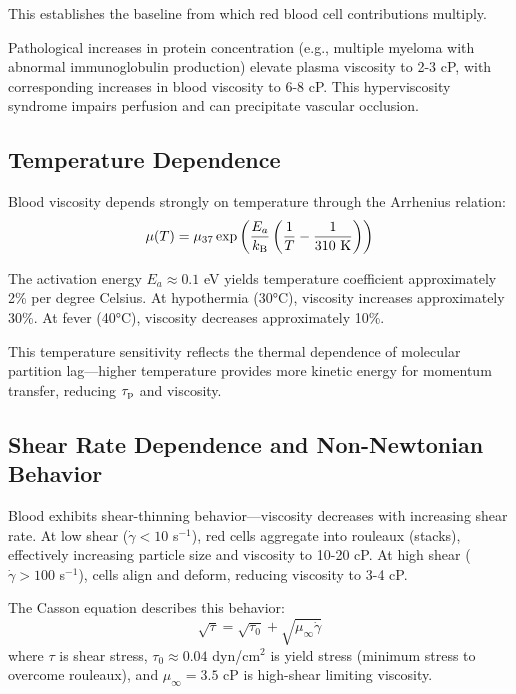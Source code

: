 This establishes the baseline from which red blood cell contributions multiply.

Pathological increases in protein concentration (e.g., multiple myeloma with abnormal immunoglobulin production) elevate plasma viscosity to 2-3 cP, with corresponding increases in blood viscosity to 6-8 cP. This hyperviscosity syndrome impairs perfusion and can precipitate vascular occlusion.

\subsection{Temperature Dependence}

Blood viscosity depends strongly on temperature through the Arrhenius relation:
\begin{equation}
\mu(T) = \mu_{37} \exp\left(\frac{E_{a}}{k_{\mathrm{B}}}\left(\frac{1}{T} - \frac{1}{310~\mathrm{K}}\right)\right)
\end{equation}

The activation energy $E_{a} \approx 0.1$ eV yields temperature coefficient approximately 2\% per degree Celsius. At hypothermia (30°C), viscosity increases approximately 30\%. At fever (40°C), viscosity decreases approximately 10\%.

This temperature sensitivity reflects the thermal dependence of molecular partition lag—higher temperature provides more kinetic energy for momentum transfer, reducing $\tau_{\mathrm{p}}$ and viscosity.

\subsection{Shear Rate Dependence and Non-Newtonian Behavior}

Blood exhibits shear-thinning behavior—viscosity decreases with increasing shear rate. At low shear ($\dot{\gamma} < 10$ s$^{-1}$), red cells aggregate into rouleaux (stacks), effectively increasing particle size and viscosity to 10-20 cP. At high shear ($\dot{\gamma} > 100$ s$^{-1}$), cells align and deform, reducing viscosity to 3-4 cP.

The Casson equation describes this behavior:
\begin{equation}
\sqrt{\tau} = \sqrt{\tau_{0}} + \sqrt{\mu_{\infty} \dot{\gamma}}
\end{equation}
where $\tau$ is shear stress, $\tau_{0} \approx 0.04$ dyn/cm$^{2}$ is yield stress (minimum stress to overcome rouleaux), and $\mu_{\infty} = 3.5$ cP is high-shear limiting viscosity.

